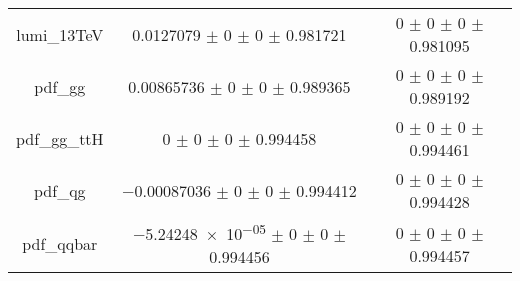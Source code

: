 \begin{table}
\begin{tabular}{ccc}
lumi\_13TeV & \num{0.0127079} $\pm$ \num{0} $\pm$ \num{0} $\pm$ \num{0.981721} & \num{0} $\pm$ \num{0} $\pm$ \num{0} $\pm$ \num{0.981095}\\
pdf\_gg & \num{0.00865736} $\pm$ \num{0} $\pm$ \num{0} $\pm$ \num{0.989365} & \num{0} $\pm$ \num{0} $\pm$ \num{0} $\pm$ \num{0.989192}\\
pdf\_gg\_ttH & \num{0} $\pm$ \num{0} $\pm$ \num{0} $\pm$ \num{0.994458} & \num{0} $\pm$ \num{0} $\pm$ \num{0} $\pm$ \num{0.994461}\\
pdf\_qg & \num{-0.00087036} $\pm$ \num{0} $\pm$ \num{0} $\pm$ \num{0.994412} & \num{0} $\pm$ \num{0} $\pm$ \num{0} $\pm$ \num{0.994428}\\
pdf\_qqbar & \num{-5.24248e-05} $\pm$ \num{0} $\pm$ \num{0} $\pm$ \num{0.994456} & \num{0} $\pm$ \num{0} $\pm$ \num{0} $\pm$ \num{0.994457}\\
\bottomrule
\end{tabular}
\end{table}